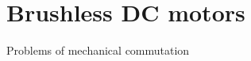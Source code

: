 \documentclass[compress]{beamer}
\begin{document}
\section[Brushless motors]{Brushless DC motors}

{
\begin{frame}{Problems of mechanical commutation}

%
%

\end{frame}
}
\end{document}
